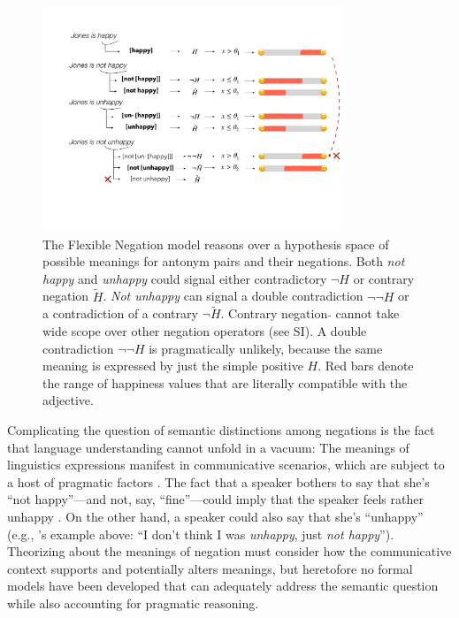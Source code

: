 \documentclass[floatsintext,doc]{apa6}
\newcommand{\ourmodel}{Flexible Negation\xspace}
\begin{document}
\begin{figure}[t]
\centering \includegraphics[width=0.8\textwidth]{figs/schematicMeanings}  
\caption{The \ourmodel model reasons over a hypothesis space of possible meanings for antonym pairs and their negations.
Both \emph{not happy} and \emph{unhappy} could signal either contradictory $\neg H$ or contrary negation $\tilde{H}$.
\emph{Not unhappy} can signal a double contradiction  $\neg \neg H$  or a contradiction of a contrary  $ \neg \tilde{H}$.
Contrary negation $\tilde{}$ cannot take wide scope over other negation operators (see SI). 
A double contradiction  $\neg \neg H$  is pragmatically unlikely, because the same meaning is expressed by just the simple positive $H$.
 Red bars denote the range of happiness values that are literally compatible with the adjective.
}
\label{fig:meanings}
\end{figure}

Complicating the question of semantic distinctions among negations is the fact that language understanding cannot unfold in a vacuum: The meanings of linguistics expressions manifest in communicative scenarios, which are subject to a host of pragmatic factors \cite{Grice1975, clark1996using, levinson2000presumptive}.
The fact that a speaker bothers to say that she's ``not happy''---and not, say, ``fine''---could imply that the speaker feels rather unhappy
\cite{Horn1989:Natural, Blutner2004:pragmatics, benz2018scalar}.
On the other hand, a speaker could also say that she's ``unhappy'' (e.g., 's example above: ``I don't think I was \emph{unhappy}, just \emph{not happy}'').
Theorizing about the meanings of negation must consider how the communicative context supports and potentially alters meanings, but heretofore no formal models have been developed that can adequately address the semantic question while also accounting for pragmatic reasoning.
\end{document}
